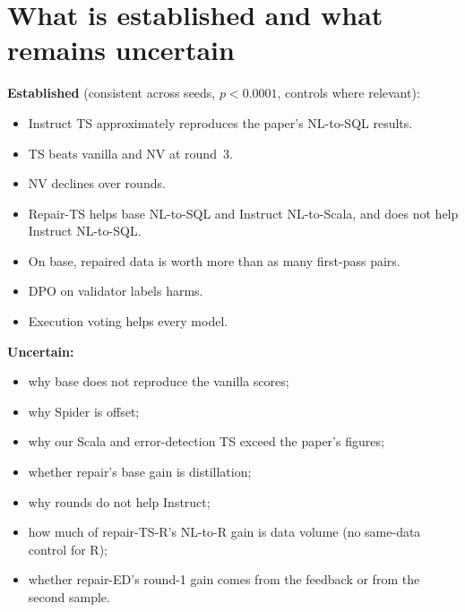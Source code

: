\section{What is established and what remains uncertain}

\begin{keypoint}
\textbf{Established} (consistent across seeds, $p<0.0001$, controls where relevant):
\begin{itemize}
\item Instruct TS approximately reproduces the paper's NL-to-SQL results.
\item TS beats vanilla and NV at round~3.
\item NV declines over rounds.
\item Repair-TS helps base NL-to-SQL and Instruct NL-to-Scala, and does not help Instruct NL-to-SQL.
\item On base, repaired data is worth more than as many first-pass pairs.
\item DPO on validator labels harms.
\item Execution voting helps every model.
\end{itemize}
\textbf{Uncertain:}
\begin{itemize}
\item why base does not reproduce the vanilla scores;
\item why Spider is offset;
\item why our Scala and error-detection TS exceed the paper's figures;
\item whether repair's base gain is distillation;
\item why rounds do not help Instruct;
\item how much of repair-TS-R's NL-to-R gain is data volume (no same-data control for R);
\item whether repair-ED's round-1 gain comes from the feedback or from the second sample.
\end{itemize}
\end{keypoint}

